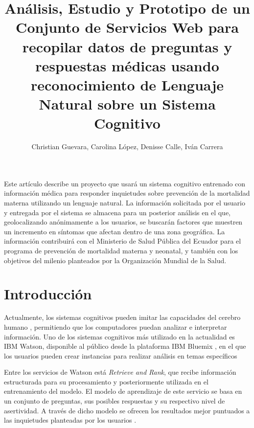 \documentclass[12pt]{article}
\title{Análisis, Estudio y Prototipo de un Conjunto de Servicios Web para recopilar datos de preguntas y respuestas médicas usando reconocimiento de Lenguaje Natural sobre un Sistema Cognitivo}
\author{Christian Guevara, Carolina López, Denisse Calle, Iván Carrera\inst{1}}
\begin{document}
 

\maketitle

\begin{abstract}
  
\end{abstract}
     
\begin{resumen} 
Este artículo describe un proyecto que usará un sistema cognitivo entrenado con información médica para responder inquietudes sobre prevención de la mortalidad materna utilizando un lenguaje natural. La información solicitada por el usuario y entregada por el sistema se almacena para un posterior análisis en el que, geolocalizando anónimamente a los usuarios, se buscarán factores que muestren un incremento en síntomas que afectan dentro de una zona geográfica. La información contribuirá con el Ministerio de Salud Pública del Ecuador para el programa de prevención de mortalidad materna y neonatal, y también con los objetivos del milenio planteados por la Organización Mundial de la Salud.
\end{resumen}


\section{Introducción}
Actualmente, los sistemas cognitivos pueden imitar las capacidades del cerebro humano \cite{banavar2015watson}, permitiendo que los computadores puedan analizar e interpretar información. %
Uno de los sistemas cognitivos más utilizado en la actualidad es IBM Watson, disponible al público desde la plataforma IBM Bluemix \cite{watson2016}, en el que los usuarios pueden crear instancias para realizar análisis en temas específicos

Entre los servicios de Watson está \emph{Retrieve and Rank}, que recibe información estructurada para su procesamiento y posteriormente utilizada en el entrenamiento del modelo. El modelo de aprendizaje de este servicio se basa en un conjunto de preguntas, sus posibles respuestas y su respectivo nivel de asertividad. A través de dicho modelo se ofrecen los resultados mejor puntuados a las inquietudes planteadas por los usuarios \cite{watson2016}. 
\end{document}
